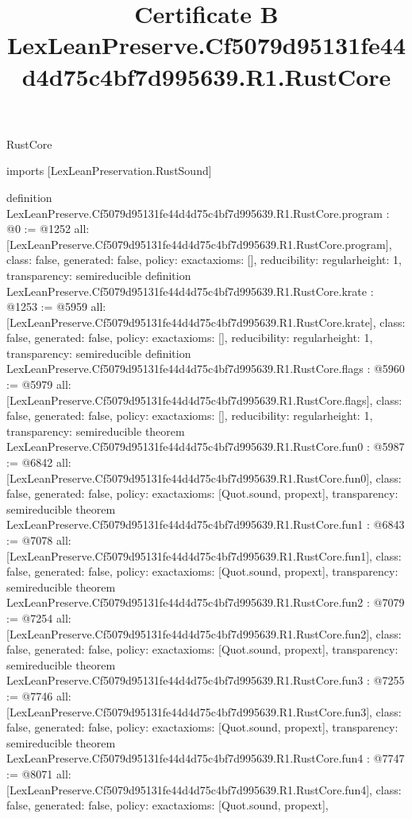 \begin{lexlean}{RustCore}
\title{Certificate B LexLeanPreserve.Cf5079d95131fe44d4d75c4bf7d995639.R1.RustCore}
\begin{coremodule}
imports [LexLeanPreservation.RustSound]

definition LexLeanPreserve.Cf5079d95131fe44d4d75c4bf7d995639.R1.RustCore.program : @0 := @1252 {
  all: [LexLeanPreserve.Cf5079d95131fe44d4d75c4bf7d995639.R1.RustCore.program],
  class: false,
  generated: false,
  policy: exact{axioms: []},
  reducibility: regular{height: 1},
  transparency: semireducible
}
definition LexLeanPreserve.Cf5079d95131fe44d4d75c4bf7d995639.R1.RustCore.krate : @1253 := @5959 {
  all: [LexLeanPreserve.Cf5079d95131fe44d4d75c4bf7d995639.R1.RustCore.krate],
  class: false,
  generated: false,
  policy: exact{axioms: []},
  reducibility: regular{height: 1},
  transparency: semireducible
}
definition LexLeanPreserve.Cf5079d95131fe44d4d75c4bf7d995639.R1.RustCore.flags : @5960 := @5979 {
  all: [LexLeanPreserve.Cf5079d95131fe44d4d75c4bf7d995639.R1.RustCore.flags],
  class: false,
  generated: false,
  policy: exact{axioms: []},
  reducibility: regular{height: 1},
  transparency: semireducible
}
theorem LexLeanPreserve.Cf5079d95131fe44d4d75c4bf7d995639.R1.RustCore.fun0 : @5987 := @6842 {
  all: [LexLeanPreserve.Cf5079d95131fe44d4d75c4bf7d995639.R1.RustCore.fun0],
  class: false,
  generated: false,
  policy: exact{axioms: [Quot.sound, propext]},
  transparency: semireducible
}
theorem LexLeanPreserve.Cf5079d95131fe44d4d75c4bf7d995639.R1.RustCore.fun1 : @6843 := @7078 {
  all: [LexLeanPreserve.Cf5079d95131fe44d4d75c4bf7d995639.R1.RustCore.fun1],
  class: false,
  generated: false,
  policy: exact{axioms: [Quot.sound, propext]},
  transparency: semireducible
}
theorem LexLeanPreserve.Cf5079d95131fe44d4d75c4bf7d995639.R1.RustCore.fun2 : @7079 := @7254 {
  all: [LexLeanPreserve.Cf5079d95131fe44d4d75c4bf7d995639.R1.RustCore.fun2],
  class: false,
  generated: false,
  policy: exact{axioms: [Quot.sound, propext]},
  transparency: semireducible
}
theorem LexLeanPreserve.Cf5079d95131fe44d4d75c4bf7d995639.R1.RustCore.fun3 : @7255 := @7746 {
  all: [LexLeanPreserve.Cf5079d95131fe44d4d75c4bf7d995639.R1.RustCore.fun3],
  class: false,
  generated: false,
  policy: exact{axioms: [Quot.sound, propext]},
  transparency: semireducible
}
theorem LexLeanPreserve.Cf5079d95131fe44d4d75c4bf7d995639.R1.RustCore.fun4 : @7747 := @8071 {
  all: [LexLeanPreserve.Cf5079d95131fe44d4d75c4bf7d995639.R1.RustCore.fun4],
  class: false,
  generated: false,
  policy: exact{axioms: [Quot.sound, propext]},
}
\end{coremodule}
\end{lexlean}
